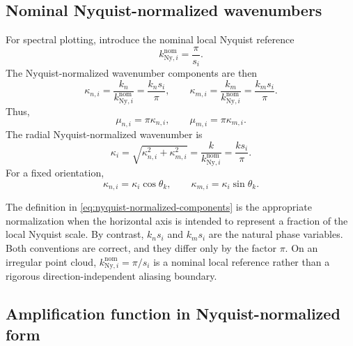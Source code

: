\documentclass[11pt]{article}
\numberwithin{equation}{section}
\begin{document}
\subsection{Nominal Nyquist-normalized wavenumbers}

For spectral plotting, introduce the nominal local Nyquist reference
\begin{equation}
    k_{\mathrm{Ny},i}^{\mathrm{nom}}
    =
    \frac{\pi}{s_i}.
    \label{eq:nominal-nyquist}
\end{equation}
The Nyquist-normalized wavenumber components are then
\begin{equation}
    \boxed{
    \kappa_{n,i}
    =
    \frac{k_n}{k_{\mathrm{Ny},i}^{\mathrm{nom}}}
    =
    \frac{k_ns_i}{\pi},
    \qquad
    \kappa_{m,i}
    =
    \frac{k_m}{k_{\mathrm{Ny},i}^{\mathrm{nom}}}
    =
    \frac{k_ms_i}{\pi}.
    }
    \label{eq:nyquist-normalized-components}
\end{equation}
Thus,
\begin{equation}
    \mu_{n,i}=\pi\kappa_{n,i},
    \qquad
    \mu_{m,i}=\pi\kappa_{m,i}.
    \label{eq:mu-kappa-relation}
\end{equation}
The radial Nyquist-normalized wavenumber is
\begin{equation}
    \kappa_i
    =
    \sqrt{\kappa_{n,i}^2+\kappa_{m,i}^2}
    =
    \frac{k}{k_{\mathrm{Ny},i}^{\mathrm{nom}}}
    =
    \frac{ks_i}{\pi}.
    \label{eq:radial-nyquist-normalization}
\end{equation}
For a fixed orientation,
\begin{equation}
    \kappa_{n,i}=\kappa_i\cos\theta_k,
    \qquad
    \kappa_{m,i}=\kappa_i\sin\theta_k.
    \label{eq:normalized-direction}
\end{equation}

The definition in \cref{eq:nyquist-normalized-components} is the appropriate normalization when the horizontal axis is intended to represent a fraction of the local Nyquist scale. By contrast, $k_ns_i$ and $k_ms_i$ are the natural phase variables. Both conventions are correct, and they differ only by the factor $\pi$. On an irregular point cloud, $k_{\mathrm{Ny},i}^{\mathrm{nom}}=\pi/s_i$ is a nominal local reference rather than a rigorous direction-independent aliasing boundary.

\subsection{Amplification function in Nyquist-normalized form}
\end{document}
